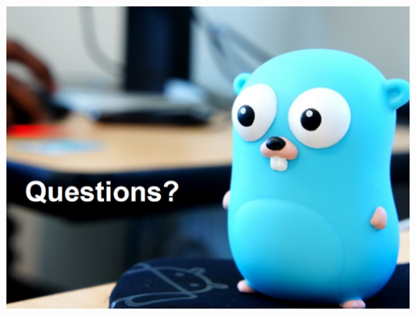 \documentclass[14pt]{beamer}
\begin{document}
{
\begin{frame}
        \includegraphics[width=\textwidth]{img/questions.PNG}
\end{frame}
}
\end{document}

